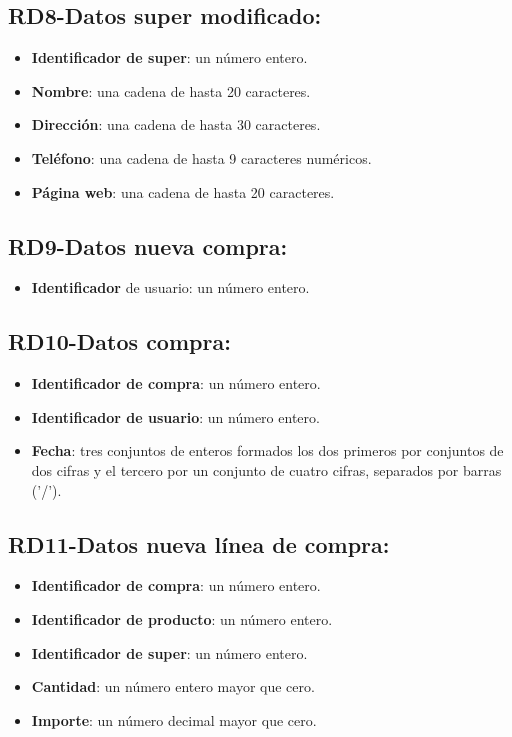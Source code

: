 \documentclass[a4paper,12pt]{report}
\begin{document}
\subsection{RD8-Datos super modificado:}
\label{sec-2-1-8}
\begin{itemize}
\item \textbf{Identificador de super}: un número entero.
\item \textbf{Nombre}:  una cadena de hasta 20 caracteres.
\item \textbf{Dirección}:  una cadena de hasta 30 caracteres.
\item \textbf{Teléfono}: una cadena de hasta 9 caracteres numéricos.
\item \textbf{Página web}: una cadena de hasta 20 caracteres.
\end{itemize}
\subsection{RD9-Datos nueva compra:}
\label{sec-2-1-9}
\begin{itemize}
\item \textbf{Identificador} de usuario: un número entero.
\end{itemize}

\subsection{RD10-Datos compra:}
\label{sec-2-1-10}
\begin{itemize}
\item \textbf{Identificador de compra}: un número entero.
\item \textbf{Identificador de usuario}: un número entero.
\item \textbf{Fecha}: tres conjuntos de enteros formados los dos primeros por conjuntos de dos cifras y el                 tercero por un conjunto de cuatro cifras, separados por barras ('/').
\end{itemize}
\subsection{RD11-Datos nueva línea de compra:}
\label{sec-2-1-11}
\begin{itemize}
\item \textbf{Identificador de compra}: un número entero.
\item \textbf{Identificador de producto}: un número entero.
\item \textbf{Identificador de super}: un número entero.
\item \textbf{Cantidad}: un número entero mayor que cero.
\item \textbf{Importe}: un número decimal mayor que cero.
\end{itemize}
\end{document}
